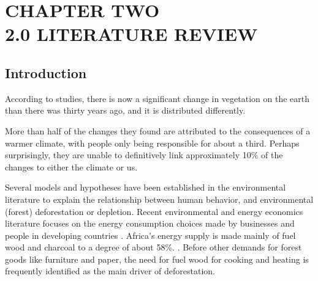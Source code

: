 
\chapter{CHAPTER TWO\\2.0 LITERATURE REVIEW} %

\label{Chapter2} %



\section{Introduction}
According to studies, there is now a significant change in vegetation on the earth than there was thirty years ago, and it is distributed differently.

More than half of the changes they found are attributed to the consequences of a warmer climate, with people only being responsible for about a third. Perhaps surprisingly, they are unable to definitively link approximately 10\% of the changes to either the climate or us.\parencite{alex2013}

Several models and hypotheses have been established in the environmental literature to explain the relationship between human behavior, and environmental (forest) deforestation or depletion. Recent environmental and energy economics literature focuses on the energy consumption
choices made by businesses and people in developing countries  \parencite{gertler2016}. Africa's energy supply
is made mainly of fuel wood and charcoal to a degree of about 58\%.\parencite{specht2015} . Before other
demands for forest goods like furniture and paper, the need for fuel wood for cooking and heating is frequently identified as the main driver
of deforestation.

